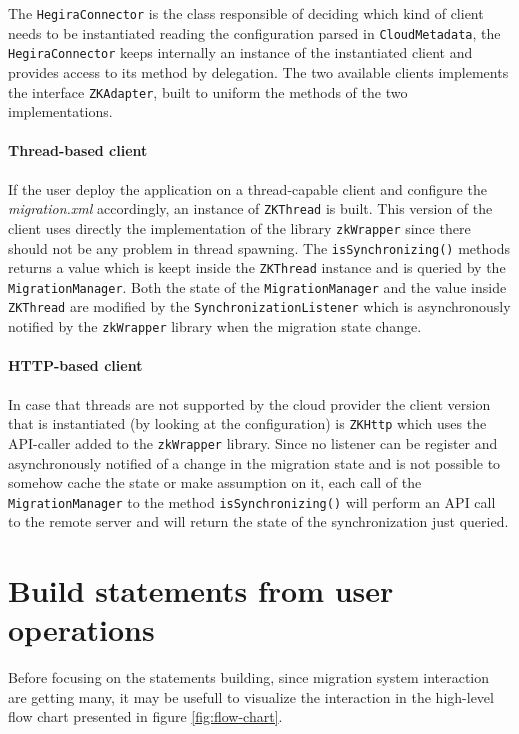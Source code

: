 \noindent The \texttt{HegiraConnector} is the class responsible of deciding which kind of client needs to be instantiated reading the configuration parsed  in \texttt{CloudMetadata}, the \texttt{HegiraConnector}  keeps internally an instance of the instantiated client and provides access to its method by delegation.
The two available clients implements the interface \texttt{ZKAdapter}, built to uniform the methods of the two implementations.

\paragraph{Thread-based client} If the user deploy the application on a thread-capable client and configure the \textit{migration.xml} accordingly, an instance of \texttt{ZKThread} is built. This version of the client uses directly the implementation of the library \texttt{zkWrapper} since there should not be any problem in thread spawning.
The \texttt{isSynchronizing()} methods returns a value which is keept inside the \texttt{ZKThread} instance and is queried by the \texttt{MigrationManager}.
Both the state of the \texttt{MigrationManager} and the value inside \texttt{ZKThread} are modified by the \texttt{SynchronizationListener} which is asynchronously notified by the \texttt{zkWrapper} library when the migration state change.

\paragraph{HTTP-based client} In case that threads are not supported by the cloud provider the client version that is instantiated (by looking at the configuration) is \texttt{ZKHttp} which uses the API-caller added to the \texttt{zkWrapper} library.
Since no listener can be register and asynchronously notified of a change in the migration state and is not possible to somehow cache the state or make assumption on it, each call of the \texttt{MigrationManager} to the method \texttt{isSynchronizing()} will perform an API call to the remote server and will return the state of the synchronization just queried.

\section{Build statements from user operations}
\label{sec:statements}
Before focusing on the statements building, since migration system interaction are getting many, it may be usefull to visualize the interaction in the high-level flow chart presented in figure \ref{fig:flow-chart}.

